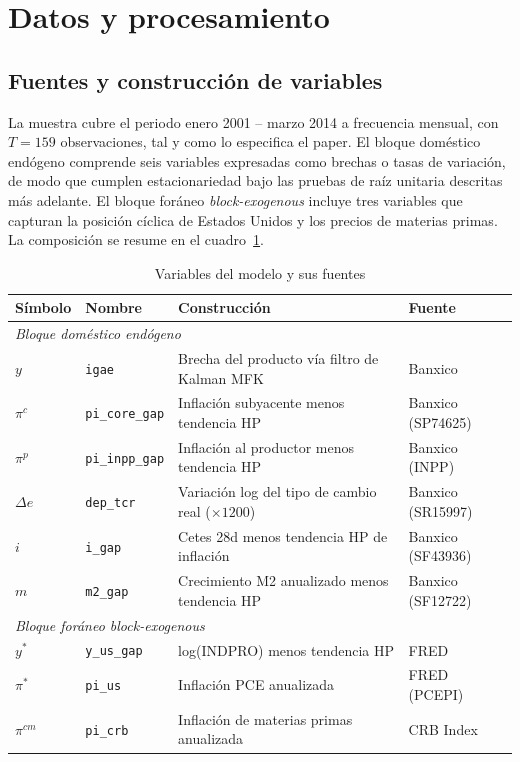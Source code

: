 \documentclass[11pt,letterpaper]{article}
\begin{document}
\section{Datos y procesamiento}\label{sec:datos}

\subsection{Fuentes y construcción de variables}

La muestra cubre el periodo enero 2001 -- marzo 2014 a frecuencia mensual, con $T=159$ observaciones, tal y como lo especifica el paper. El bloque doméstico endógeno comprende seis variables expresadas como brechas o tasas de variación, de modo que cumplen estacionariedad bajo las pruebas de raíz unitaria descritas más adelante. El bloque foráneo \textit{block-exogenous} incluye tres variables que capturan la posición cíclica de Estados Unidos y los precios de materias primas. La composición se resume en el cuadro~\ref{tab:variables}.

\begin{table}[H]
\centering
\caption{Variables del modelo y sus fuentes}
\label{tab:variables}
\small
\begin{tabular}{@{}llp{6.2cm}l@{}}
\toprule
\textbf{Símbolo} & \textbf{Nombre} & \textbf{Construcción} & \textbf{Fuente} \\
\midrule
\multicolumn{4}{l}{\textit{Bloque doméstico endógeno}} \\
\midrule
$y$ & \texttt{igae} & Brecha del producto vía filtro de Kalman MFK & Banxico \\
$\pi^c$ & \texttt{pi\_core\_gap} & Inflación subyacente menos tendencia HP & Banxico (SP74625) \\
$\pi^p$ & \texttt{pi\_inpp\_gap} & Inflación al productor menos tendencia HP & Banxico (INPP) \\
$\Delta e$ & \texttt{dep\_tcr} & Variación log del tipo de cambio real ($\times 1200$) & Banxico (SR15997) \\
$i$ & \texttt{i\_gap} & Cetes 28d menos tendencia HP de inflación & Banxico (SF43936) \\
$m$ & \texttt{m2\_gap} & Crecimiento M2 anualizado menos tendencia HP & Banxico (SF12722) \\
\midrule
\multicolumn{4}{l}{\textit{Bloque foráneo block-exogenous}} \\
\midrule
$y^*$ & \texttt{y\_us\_gap} & log(INDPRO) menos tendencia HP & FRED \\
$\pi^*$ & \texttt{pi\_us}    & Inflación PCE anualizada                     & FRED (PCEPI) \\
$\pi^{cm}$ & \texttt{pi\_crb} & Inflación de materias primas anualizada    & CRB Index \\
\bottomrule
\end{tabular}
\end{table}
\end{document}
